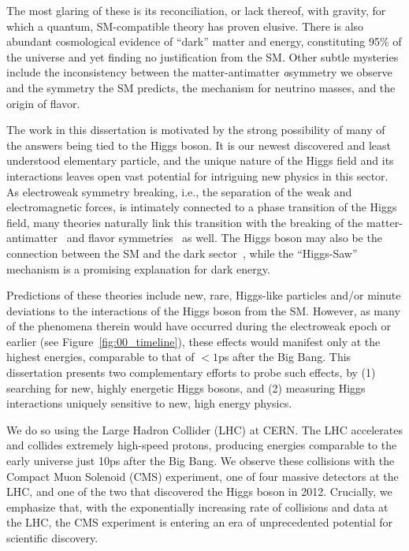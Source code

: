 The most glaring of these is its reconciliation, or lack thereof, with gravity, for which a quantum, SM-compatible theory has proven elusive.
There is also abundant cosmological evidence of ``dark'' matter and energy, constituting 95\% of the universe and yet finding no justification from the SM.
Other subtle mysteries include the inconsistency between the matter-antimatter \textit{a}symmetry  we observe and the symmetry the SM predicts, the mechanism for neutrino masses, and the origin of flavor.

The work in this dissertation is motivated by the strong possibility of many of the answers being tied to the Higgs boson.
It is our newest discovered and least understood elementary particle, and the unique nature of the Higgs field and its interactions leaves open vast potential for intriguing new physics in this sector.
As electroweak symmetry breaking, i.e., the separation of the weak and electromagnetic forces, is intimately connected to a phase transition of the Higgs field, many theories naturally link this transition with the breaking of the matter-antimatter~\cite{Morrissey_2012} and flavor symmetries~\cite{BAZZOCCHI2005372} as well.
The Higgs boson may also be the connection between the SM and the dark sector~\cite{sym13122406}, while the ``Higgs-Saw''~\cite{Krauss:2013oea} mechanism is a promising explanation for dark energy.

Predictions of these theories include new, rare, Higgs-like particles and/or minute deviations to the interactions of the Higgs boson from the SM.
However, as many of the phenomena therein would have occurred during the electroweak epoch or earlier (see Figure~\ref{fig:00_timeline}), these effects would manifest only at the highest energies, comparable to that of $<1$ps after the Big Bang.
This dissertation presents two complementary efforts to probe such effects, by (1) searching for new, highly energetic Higgs bosons, and (2) measuring Higgs interactions uniquely sensitive to new, high energy physics.

We do so using the Large Hadron Collider (LHC) at CERN.
The LHC accelerates and collides extremely high-speed protons, producing energies comparable to the early universe just 10ps after the Big Bang.
We observe these collisions with the Compact Muon Solenoid (CMS) experiment, one of four massive detectors at the LHC, and one of the two that discovered the Higgs boson in 2012.
Crucially, we emphasize that, with the exponentially increasing rate of collisions and data at the LHC, the CMS experiment is entering an era of unprecedented potential for scientific discovery.

